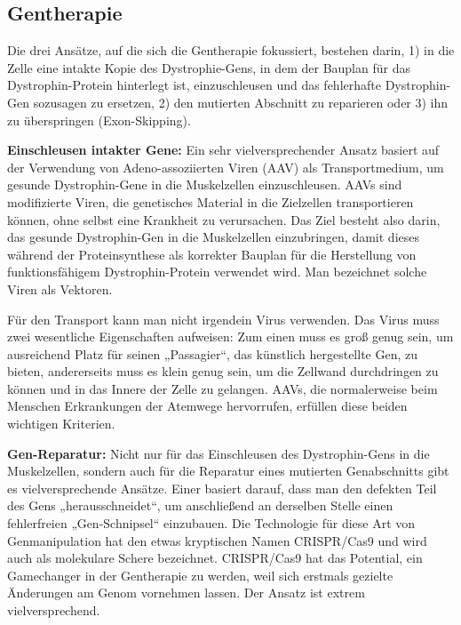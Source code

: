 \documentclass[fontsize=14pt,a4paper,headinclude,DIV=calc,automark]{scrbook}
\begin{document}
\subsection{Gentherapie}
\label{sec:therapien}

Die drei Ansätze, auf die sich die Gentherapie fokussiert, bestehen darin, 1) in die Zelle eine intakte Kopie des Dystrophie-Gens, in dem der Bauplan für das Dystrophin-Protein hinterlegt ist, einzuschleusen und das fehlerhafte Dystrophin-Gen sozusagen zu ersetzen, 2) den mutierten Abschnitt zu reparieren oder 3) ihn zu überspringen (Exon-Skipping).

\vspace{0.5\baselineskip}

\noindent \textbf{Einschleusen intakter Gene:} Ein sehr vielversprechender Ansatz basiert auf der Verwendung von Adeno-assoziierten Viren (AAV) als Transportmedium, um gesunde Dystrophin-Gene in die Muskelzellen einzuschleusen. AAVs sind modifizierte Viren, die genetisches Material in die Zielzellen transportieren können, ohne selbst eine Krankheit zu verursachen. Das Ziel besteht also darin, das gesunde Dystrophin-Gen in die Muskelzellen einzubringen, damit dieses während der Proteinsynthese als korrekter Bauplan für die Herstellung von funktionsfähigem Dystrophin-Protein verwendet wird. Man bezeichnet solche Viren als Vektoren.

\noindent Für den Transport kann man nicht irgendein Virus verwenden. Das Virus muss zwei wesentliche Eigenschaften aufweisen: Zum einen muss es groß genug sein, um ausreichend Platz für seinen „Passagier“, das künstlich hergestellte Gen, zu bieten, andererseits muss es klein genug sein, um die Zellwand durchdringen zu können und in das Innere der Zelle zu gelangen. AAVs, die normalerweise beim Menschen Erkrankungen der Atemwege hervorrufen, erfüllen diese beiden wichtigen Kriterien.

\vspace{0.5\baselineskip}

\noindent \textbf{Gen-Reparatur:} Nicht nur für das Einschleusen des Dystrophin-Gens in die Muskelzellen, sondern auch für die Reparatur eines mutierten Genabschnitts gibt es vielversprechende Ansätze. Einer basiert darauf, dass man den defekten Teil des Gens „herausschneidet“, um anschließend an derselben Stelle einen fehlerfreien „Gen-Schnipsel“ einzubauen. Die Technologie für diese Art von Genmanipulation hat den etwas kryptischen Namen CRISPR/Cas9 und wird auch als molekulare Schere bezeichnet. CRISPR/Cas9 hat das Potential, ein Gamechanger in der Gentherapie zu werden, weil sich erstmals gezielte Änderungen am Genom vornehmen lassen. Der Ansatz ist extrem vielversprechend.
\end{document}
